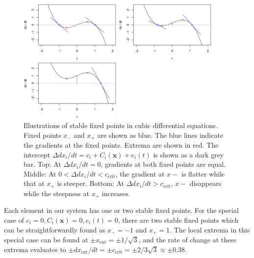 \documentclass[conference]{IEEEtran}
\newcommand{\vectorsym}[1]{\ensuremath{\mathbf{#1}}}
\newcommand{\xextremum}{\ensuremath{x_{\mathrm{ext}}}}
\newcommand{\ccrit}{\ensuremath{c_{\mathrm{crit}}}}
\newcommand{\agentimpact}{\ensuremath{e}}
\begin{document}
\begin{figure}

  \centerline{\includegraphics[width=5cm]{cubicdemo_intercept000.eps}}

  \centerline{\includegraphics[width=5cm]{cubicdemo_intercept025.eps}}

  \centerline{\includegraphics[width=5cm]{cubicdemo_intercept100.eps}}

  \caption{Illustrations of stable fixed points in cubic differential
    equations. Fixed points $x_{-}$ and $x_{+}$ are shown as blue. The
    blue lines indicate the gradients at the fixed points. Extrema are
    shown in red. The intercept
    $\Delta dx_i / dt = c_i + C_i(\vectorsym{x}) + \agentimpact_i(t)$ is
    shown as a dark grey bar. Top: At $\Delta dx_i / dt = 0$,
    gradients at both fixed points are equal. Middle: At
    $0 < \Delta dx_i / dt < \ccrit$, the gradient at $x{-}$ is flatter
    while that at $x_{+}$ is steeper. Bottom: At
    $\Delta dx_i / dt > \ccrit$, $x{-}$ disappears while the steepness
    at $x_{+}$ increases.}
  \label{fig_cubicdemo}

\end{figure}

Each element in our system has one or two stable fixed points. For the
special case of
$c_i = 0, C_i(\vectorsym{x}) = 0, \agentimpact_i(t) = 0$, there are two
stable fixed points which can be straightforwardly found as
$x_{-} = -1$ and $x_{+} = 1$. The local extrema in this special case
can be found at $\pm \xextremum = \pm 1 / \sqrt{3}$, and the rate of
change at these extrema evaluates to
$\pm d\xextremum / dt = \pm \ccrit = \pm 2 / 3\sqrt{3} \approx \pm
0.38$.
\end{document}
